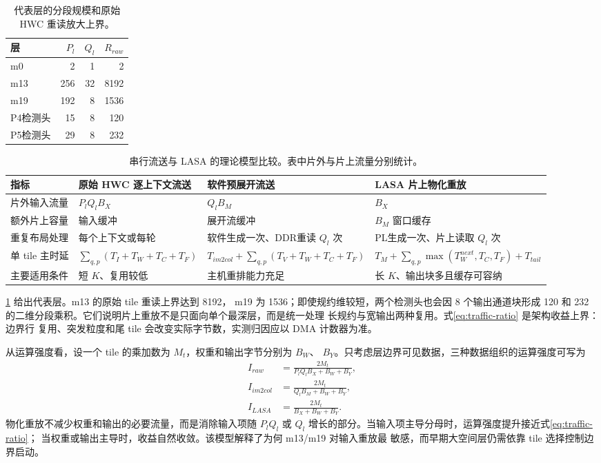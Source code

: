 \begin{table}[t]
\centering
\caption{代表层的分段规模和原始 HWC 重读放大上界。}
\label{tab:traffic-examples}
\small
\begin{tabular}{lrrr}
\toprule
层 & $P_l$ & $Q_l$ & $R_{raw}$ \\
\midrule
m0 & 2 & 1 & 2 \\
m13 & 256 & 32 & 8192 \\
m19 & 192 & 8 & 1536 \\
P4检测头 & 15 & 8 & 120 \\
P5检测头 & 29 & 8 & 232 \\
\bottomrule
\end{tabular}
\end{table}

\begin{table}[t]
\centering
\caption{串行流送与 LASA 的理论模型比较。表中片外与片上流量分别统计。}
\label{tab:model-comparison}
\small
\setlength{\tabcolsep}{5pt}
\begin{tabular}{p{25mm}p{35mm}p{35mm}p{49mm}}
\toprule
指标 & 原始 HWC 逐上下文流送 & 软件预展开流送 & LASA 片上物化重放 \\
\midrule
片外输入流量 & $P_lQ_lB_X$ & $Q_lB_M$ & $B_X$ \\
额外片上容量 & 输入缓冲 & 展开流缓冲 & $B_M$ 窗口缓存 \\
重复布局处理 & 每个上下文或每轮 & 软件生成一次、DDR重读 $Q_l$ 次 & PL生成一次、片上读取 $Q_l$ 次 \\
单 tile 主时延 & $\sum_{q,p}(T_I+T_W+T_C+T_F)$ & $T_{im2col}+\sum_{q,p}(T_V+T_W+T_C+T_F)$ & $T_M+\sum_{q,p}\max(T_W^{next},T_C,T_F)+T_{tail}$ \\
主要适用条件 & 短 $K$、复用较低 & 主机重排能力充足 & 长 $K$、输出块多且缓存可容纳 \\
\bottomrule
\end{tabular}
\end{table}

\cref{tab:traffic-examples} 给出代表层。m13 的原始 tile 重读上界达到 8192，
m19 为 1536；即使规约维较短，两个检测头也会因 8 个输出通道块形成 120 和
232 的二维分段乘积。它们说明片上重放不是只面向单个最深层，而是统一处理
长规约与宽输出两种复用。式\eqref{eq:traffic-ratio} 是架构收益上界：边界行
复用、突发粒度和尾 tile 会改变实际字节数，实测归因应以 DMA 计数器为准。

从运算强度看，设一个 tile 的乘加数为 $M_t$，权重和输出字节分别为 $B_W$、
$B_Y$。只考虑层边界可见数据，三种数据组织的运算强度可写为
\begin{align}
I_{raw}&=\frac{2M_t}{P_lQ_lB_X+B_W+B_Y},\\
I_{im2col}&=\frac{2M_t}{Q_lB_M+B_W+B_Y},\\
I_{LASA}&=\frac{2M_t}{B_X+B_W+B_Y}.
\label{eq:arithmetic-intensity}
\end{align}
物化重放不减少权重和输出的必要流量，而是消除输入项随 $P_lQ_l$ 或 $Q_l$
增长的部分。当输入项主导分母时，运算强度提升接近式\eqref{eq:traffic-ratio}；
当权重或输出主导时，收益自然收敛。该模型解释了为何 m13/m19 对输入重放最
敏感，而早期大空间层仍需依靠 tile 选择控制边界启动。

